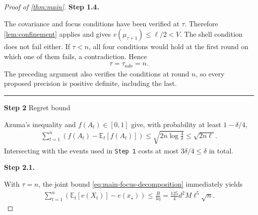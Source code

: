 \documentclass[11pt]{article}
\newcommand{\proofstep}[2]{%
    \par\medskip
    \noindent
    \textcolor{blue!55!black}{\rule{2pt}{1.2em}}%
    \hspace{0.6em}%
    {\sffamily\bfseries\color{blue!55!black}Step #1}%
    \quad
    {\sffamily #2}%
    \par\smallskip
}
\newcommand{\proofstepinline}[1]{%
    {\sffamily\bfseries\color{blue!55!black}Step #1.}\enspace
}
\newcommand{\E}{\mathbb E}
\newcommand{\1}{\mathbf 1}
\begin{document}
\begin{proof}[Proof of \cref{thm:main}]
    \proofstepinline{1.4}
    The covariance and focus conditions have been verified at $\tau$.
    Therefore \cref{lem:confinement} applies and gives
    $v(\mu_{\tau+1})\leq\ell/2<V$. The shell condition does not fail either.
    If $\tau<n$, all four conditions would hold at the first round on
    which one of them fails, a contradiction. Hence
    \begin{align}
        \tau=\tau_{\mathrm{safe}}=n.
        \label{eq:main-stability}
    \end{align}
    The preceding argument also verifies the conditions at round $n$,
    so every proposed precision is positive definite, including the last.

    \proofstep{2}{Regret bound}
    Azuma's inequality and $f(A_t)\in[0,1]$ give, with probability at least
    $1-\delta/4$,
    \begin{align}
        \sum_{t=1}^n\left(f(A_t)-\E_t[f(A_t)]\right)
        \leq\sqrt{2n\log\frac4\delta}
        \leq\sqrt{2n\ell}.
        \label{eq:action-martingale}
    \end{align}
    Intersecting with the events used in \texttt{Step 1} costs at most
    $3\delta/4\leq\delta$ in total.

    \proofstepinline{2.1}
    With $\tau=n$, the joint bound \eqref{eq:main-focus-decomposition}
    immediately yields
    \begin{align}
        \sum_{t=1}^n\left(\E_t[e(X_t)]-e(x_\star)\right)
        \leq\frac B{4\eta}
        =\frac{125}{4}d^2M\ell^5\sqrt n.
        \label{eq:main-extension-regret}
    \end{align}


\end{proof}
\end{document}
